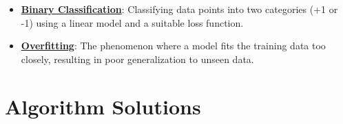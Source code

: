 \documentclass{article}%
\begin{document}
\begin{itemize}[leftmargin=*]
\item \href{\url{https://purdue.brightspace.com/d2l/common/assets/pdfjs-d2l-dist/1.0.14-legacy/web/viewer.html?file=\%252Fcontent\%252Fenforced\%252F1095467-wl.202510.CS.24300.001\%252F05L2-ML\%20Basics.pdf\%253Fou\%253D1095467\&lang=en-us\&container=d2l-fileviewer-rendered-pdf\&fullscreen=d2l-fileviewer-rendered-pdf-dialog\&height=667}#page=20}{\textbf{Binary Classification}}: Classifying data points into two categories (+1 or -1) using a linear model and a suitable loss function.%
\item \href{\url{https://purdue.brightspace.com/d2l/common/assets/pdfjs-d2l-dist/1.0.14-legacy/web/viewer.html?file=\%252Fcontent\%252Fenforced\%252F1095467-wl.202510.CS.24300.001\%252F05L2-ML\%20Basics.pdf\%253Fou\%253D1095467\&lang=en-us\&container=d2l-fileviewer-rendered-pdf\&fullscreen=d2l-fileviewer-rendered-pdf-dialog\&height=667}#page=14}{\textbf{Overfitting}}: The phenomenon where a model fits the training data too closely, resulting in poor generalization to unseen data.%
\end{itemize}

%
\section{Algorithm Solutions}%
\label{sec:AlgorithmSolutions}%
\end{document}
